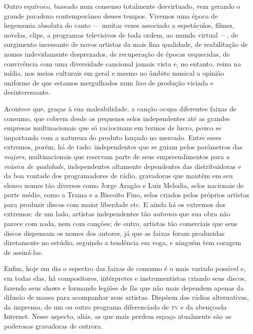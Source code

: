 Outro equívoco, baseado num consenso totalmente desvirtuado, vem gerando
o grande paradoxo contemporâneo desses tempos. Vivemos uma época de
hegemonia absoluta do canto --- muitas vezes associado a espetáculos,
filmes, novelas, clips, a programas televisivos de toda ordem, ao mundo
virtual ---, de surgimento incessante de novos artistas da mais fina
qualidade, de reabilitação de nomes indevidamente desprezados, de
recuperação de épocas esquecidas, de convivência com uma diversidade
cancional jamais vista e, no entanto, reina na mídia, nos meios
culturais em geral e mesmo no âmbito musical a opinião uniforme de que
estamos mergulhados num \textit{lixo} de produção viciada e desinteressante.

Acontece que, graças à sua maleabilidade, a canção ocupa diferentes
faixas de consumo, que cobrem desde os pequenos selos independentes até
as grandes empresas multinacionais que só raciocinam em termos de lucro,
pouco se importando com a natureza do produto lançado no mercado. Entre
esses extremos, porém, há de tudo: independentes que se guiam pelos
parâmetros das \textit{majors}, multinacionais que reservam parte de seus
empreendimentos para a \textit{música de qualidade}, independentes
altamente dependentes das distribuidoras e da boa vontade dos
programadores de rádio, gravadoras que mantêm em seu elenco nomes tão
diversos como Jorge Aragão e Luiz Melodia, selos nacionais de porte
médio, como a Trama e a Biscoito Fino, selos criados pelos próprios
artistas para produzir discos com maior liberdade etc. E ainda há os
extremos dos extremos: de um lado, artistas independentes tão
\textit{autorais} que sua obra não parece com nada, nem com canções; de
outro, artistas tão comerciais que seus discos dispensam os nomes dos
autores, já que as faixas foram produzidas diretamente no estúdio,
seguindo a tendência em voga, e ninguém tem coragem de assiná-las.

Enfim, hoje em dia o espectro das faixas de consumo é o mais variado
possível e, em todas elas, há compositores, intérpretes e
instrumentistas criando seus discos, fazendo seus shows e formando
legiões de fãs que não mais dependem apenas da difusão de massa para
acompanhar seus artistas. Dispõem das rádios alternativas, da imprensa,
de um ou outro programa diferenciado de \textsc{tv} e da abençoada Internet.
Nesse aspecto, aliás, as que mais perdem espaço atualmente são as
poderosas gravadoras de outrora.

